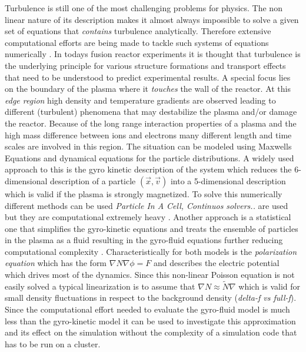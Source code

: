 \documentclass[master.tex]{subfiles}
\begin{document}
Turbulence is still one of the most challenging problems for physics. The non linear nature of its description makes it almost always impossible to solve a given set of equations that \textit{contains} turbulence analytically. Therefore extensive computational efforts are being made to tackle such systems of equations numerically \cite{IntroTurbulence}.\newline
In todays fusion reactor experiments it is thought that turbulence is the underlying principle for various structure formations and transport effects that need to be understood to predict experimental results. A special focus lies on the boundary of the plasma where it \textit{touches} the wall of the reactor. At this \textit{edge region} high density and temperature gradients are observed leading to different (turbulent) phenomena that may destabilize the plasma and/or damage the reactor.\newline
Because of the long range interaction properties of a plasma and the high mass difference between ions and electrons many different length and time scales are involved in this region.\newline
The situation can be modeled using Maxwells Equations and dynamical equations for the particle distributions. A widely used approach to this is the gyro kinetic description of the system which reduces the 6-dimensional description of a particle $(\vec{x},\vec{v})$ into a 5-dimensional description which is valid if the plasma is strongly magnetized. To solve this numerically different methods can be used \textit{Particle In A Cell, Continuos solvers..} are used but they are computational extremely heavy \cite{GyroKineticCodes}.\newline
Another approach is a statistical one that simplifies the gyro-kinetic equations and treats the ensemble of particles in the plasma as a fluid resulting in the gyro-fluid equations further reducing computational complexity \cite{HeldDisseration}.\newline
Characteristically for both models is the \textit{polarization equation} which has the form $\nabla N \nabla \phi = F$ and describes the electric potential which drives most of the dynamics. Since this non-linear Poisson equation is not easily solved a typical linearization is to assume that $\nabla N \approx \tilde{N} \nabla$ which is valid for small density fluctuations in respect to the background density (\textit{delta-f vs full-f}). Since the computational effort needed to evaluate the gyro-fluid model is much less than the gyro-kinetic model it can be used to investigate this approximation and its effect on the simulation without the complexity of a simulation code that has to be run on a cluster.\newline
\end{document}
